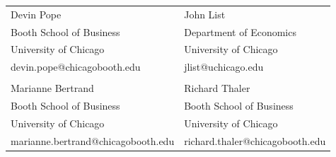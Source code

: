 \documentclass[11pt]{article}
\begin{document}
\begin{tabular}[t]{@{}p{\textwidth-\rcollength}p{\rcollength}}
Devin Pope  & John List \\
Booth School of Business & Department of Economics \\
University of Chicago & University of Chicago \\
devin.pope@chicagobooth.edu & jlist@uchicago.edu \\
\\
Marianne Bertrand  & Richard Thaler \\
Booth School of Business & Booth School of Business \\
University of Chicago & University of Chicago \\
marianne.bertrand@chicagobooth.edu & richard.thaler@chicagobooth.edu \\
\end{tabular}
\end{document}
